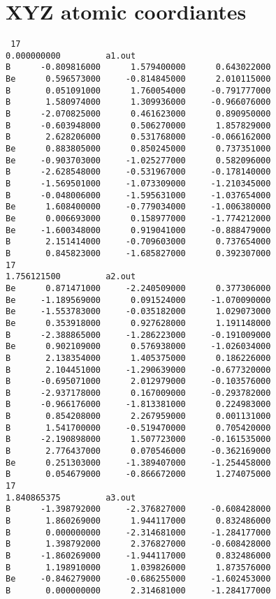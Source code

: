 \documentclass[prb,aps,preprint,showkeys,showpacs]{revtex4}
\begin{document}
\section{XYZ atomic coordiantes}
\label{appendix:c}
\begin{verbatim}
 17    
0.000000000         a1.out
B      -0.809816000      1.579400000      0.643022000
Be      0.596573000     -0.814845000      2.010115000
B       0.051091000      1.760054000     -0.791777000
B       1.580974000      1.309936000     -0.966076000
B      -2.070825000      0.461623000      0.890950000
B      -0.603948000      0.506270000      1.857829000
B       2.628206000      0.531768000     -0.066162000
Be      0.883805000      0.850245000      0.737351000
Be     -0.903703000     -1.025277000      0.582096000
B      -2.628548000     -0.531967000     -0.178140000
B      -1.569501000     -1.073309000     -1.210345000
B      -0.048006000     -1.595631000     -1.037654000
Be      1.608400000     -0.779034000     -1.006380000
Be      0.006693000      0.158977000     -1.774212000
Be     -1.600348000      0.919041000     -0.888479000
B       2.151414000     -0.709603000      0.737654000
B       0.845823000     -1.685827000      0.392307000
17    
1.756121500         a2.out
Be      0.871471000     -2.240509000      0.377306000
Be     -1.189569000      0.091524000     -1.070090000
Be     -1.553783000     -0.035182000      1.029073000
Be      0.353918000      0.927628000      1.191148000
B      -2.388865000     -1.286223000     -0.191009000
Be      0.902109000      0.576938000     -1.026034000
B       2.138354000      1.405375000      0.186226000
B       2.104451000     -1.290639000     -0.677320000
B      -0.695071000      2.012979000     -0.103576000
B      -2.937178000      0.167009000     -0.293782000
B      -0.966176000     -1.813381000      0.224983000
B       0.854208000      2.267959000      0.001131000
B       1.541700000     -0.519470000      0.705420000
B      -2.190898000      1.507723000     -0.161535000
B       2.776437000      0.070546000     -0.362169000
Be      0.251303000     -1.389407000     -1.254458000
B       0.054679000     -0.866672000      1.274075000
17    
1.840865375         a3.out
B      -1.398792000     -2.376827000     -0.608428000
B       1.860269000      1.944117000      0.832486000
B       0.000000000     -2.314681000     -1.284177000
B       1.398792000      2.376827000     -0.608428000
B      -1.860269000     -1.944117000      0.832486000
B       1.198910000      1.039826000      1.873576000
Be     -0.846279000     -0.686255000     -1.602453000
B       0.000000000      2.314681000     -1.284177000

\end{verbatim}
\end{document}
